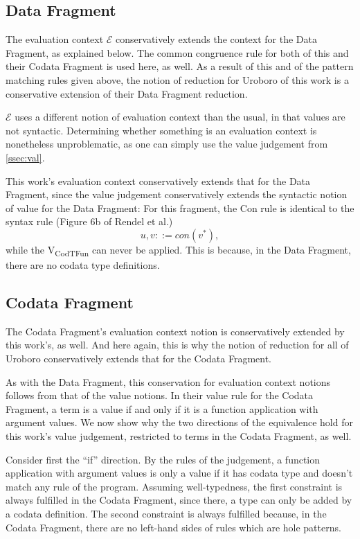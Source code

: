 \subsection{Data Fragment}
\label{ssec:df}

The evaluation context $\mathcal{E}$ conservatively extends the context for the Data Fragment, as explained below. The common congruence rule for both of this and their Codata Fragment is used here, as well. As a result of this and of the pattern matching rules given above, the notion of reduction for Uroboro of this work is a conservative extension of their Data Fragment reduction.

$\mathcal{E}$ uses a different notion of evaluation context than the usual, in that values are not syntactic. Determining whether something is an evaluation context is nonetheless unproblematic, as one can simply use the value judgement from \autoref{ssec:val}.

This work's evaluation context conservatively extends that for the Data Fragment, since the value judgement conservatively extends the syntactic notion of value for the Data Fragment: For this fragment, the Con rule is identical to the syntax rule (Figure 6b of Rendel et al.\cite{rendel15automatic})
\[
u, v ::= con(v^*),
\]
while the V\textsubscript{CodTFun} can never be applied. This is because, in the Data Fragment, there are no codata type definitions.

\subsection{Codata Fragment}
\label{ssec:codf}

The Codata Fragment's evaluation context notion is conservatively extended by this work's, as well. And here again, this is why the notion of reduction for all of Uroboro conservatively extends that for the Codata Fragment.

As with the Data Fragment, this conservation for evaluation context notions follows from that of the value notions. In their value rule for the Codata Fragment, a term is a value if and only if it is a function application with argument values. We now show why the two directions of the equivalence hold for this work's value judgement, restricted to terms in the Codata Fragment, as well.

Consider first the ``if'' direction. By the rules of the judgement, a function application with argument values is only a value if it has codata type and doesn't match any rule of the program. Assuming well-typedness, the first constraint is always fulfilled in the Codata Fragment, since there, a type can only be added by a codata definition. The second constraint is always fulfilled because, in the Codata Fragment, there are no left-hand sides of rules which are hole patterns.

